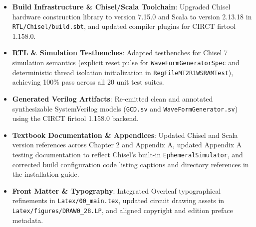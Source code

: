\begin{itemize}
    \item \textbf{Build Infrastructure \& Chisel/Scala Toolchain}: Upgraded Chisel hardware construction library to version 7.15.0 and Scala to version 2.13.18 in \texttt{RTL/Chisel/build.sbt}, and updated compiler plugins for CIRCT firtool 1.158.0.
    \item \textbf{RTL \& Simulation Testbenches}: Adapted testbenches for Chisel 7 simulation semantics (explicit reset pulse for \texttt{WaveFormGeneratorSpec} and deterministic thread isolation initialization in \texttt{RegFileMT2R1WSRAMTest}), achieving 100\% pass across all 20 unit test suites.
    \item \textbf{Generated Verilog Artifacts}: Re-emitted clean and annotated synthesizable SystemVerilog models (\texttt{GCD.sv} and \texttt{WaveFormGenerator.sv}) using the CIRCT firtool 1.158.0 backend.
    \item \textbf{Textbook Documentation \& Appendices}: Updated Chisel and Scala version references across Chapter 2 and Appendix A, updated Appendix A testing documentation to reflect Chisel's built-in \texttt{EphemeralSimulator}, and corrected build configuration code listing captions and directory references in the installation guide.
    \item \textbf{Front Matter \& Typography}: Integrated Overleaf typographical refinements in \texttt{Latex/00\_main.tex}, updated circuit drawing assets in \texttt{Latex/figures/DRAW0\_28.LP}, and aligned copyright and edition preface metadata.
\end{itemize}
